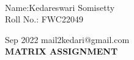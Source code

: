 \documentclass[10pt,a4paper]{report}
\begin{document}
 \vspace{3mm}\\ \raggedleft Name:Kedareswari Somisetty\vspace{2mm}\\ \raggedleft Roll No.: FWC22049\vspace{2mm}\\ \raggedright Sep 2022 \hspace{12cm} \raggedleft mail2kedari@gmail.com \vspace{10mm}
\\ \centering \Large \textbf{MATRIX ASSIGNMENT} \normalsize \vspace{15mm}
\end{document}
